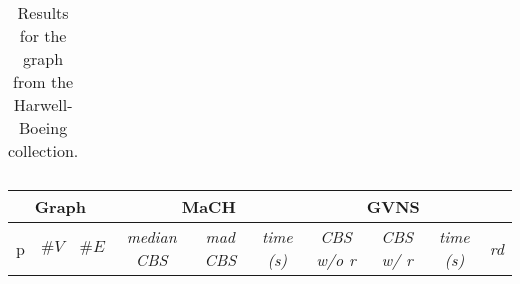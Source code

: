 \documentclass{scrartcl}
\theoremstyle{plain}
\newcommand{\algo}{MaCH}
\newcommand{\gvns}{GVNS}
\newcommand{\cbs}{CBS}
\begin{document}
\begin{table}[!ht]
\begin{tabular}{|lll|rrr|rrr|r|}
\hline

\end{tabular}

	\caption{\label{tab:harwell_perf}Results for the graph from the 
Harwell-Boeing collection.}
\end{table}





\begin{table}[!ht]
	\centering
	\scriptsize
	\begin{tabular}{|lll|rrr|rrr|r|}
	\hline
\multicolumn{3}{|c}{\textbf{Graph}} &  \multicolumn{3}{|c|}{\textbf{\algo{}}} & 
\multicolumn{3}{c|}{\textbf{\gvns{}}} & \\ \hline

\multicolumn{1}{|c}{p} & \multicolumn{1}{c}{$\#V$} & 
\multicolumn{1}{c|}{$\#E$} &

\multicolumn{1}{|c}{\emph{median \cbs{}}} & \multicolumn{1}{c}{\emph{mad 
\cbs{}}} & \multicolumn{1}{c|}{ \emph{time (s)}} &

\multicolumn{1}{|c}{\emph{\cbs{} w/o r}} & \multicolumn{1}{c}{\emph{\cbs{} w/ 
r}} & \multicolumn{1}{c|}{ \emph{time (s)}} & 
\multicolumn{1}{c|}{\emph{rd}} \\ 
\hline


\end{tabular}
\end{table}
\end{document}
